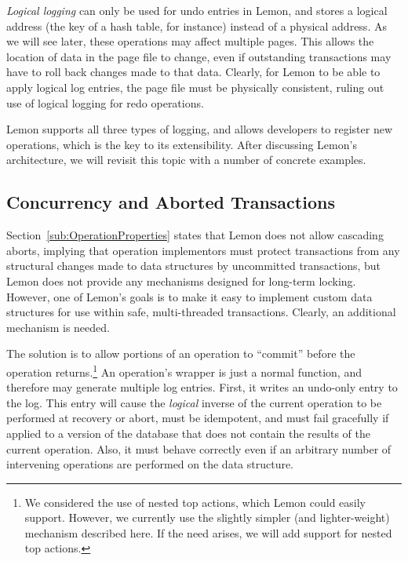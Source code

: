 \documentclass[letterpaper,twocolumn,english]{article}
\newcommand{\yad}{Lemon\xspace}
\begin{document}
{\em Logical logging } can only be used for undo entries in \yad, and
stores a logical address (the key of a hash table, for instance)
instead of a physical address. As we will see later, these operations
may affect multiple pages.  This allows the location of data in the
page file to change, even if outstanding transactions may have to roll
back changes made to that data. Clearly, for \yad to be able to apply
logical log entries, the page file must be physically consistent,
ruling out use of logical logging for redo operations.

\yad supports all three types of logging, and allows developers to
register new operations, which is the key to its extensibility. After
discussing \yad's architecture, we will revisit this topic with a number of
concrete examples.


\subsection{Concurrency and Aborted Transactions}


Section~\ref{sub:OperationProperties} states that \yad does not
allow cascading aborts, implying that operation implementors must
protect transactions from any structural changes made to data structures
by uncommitted transactions, but \yad does not provide any mechanisms
designed for long-term locking. However, one of \yad's goals is to
make it easy to implement custom data structures for use within safe,
multi-threaded transactions. Clearly, an additional mechanism is needed.

The solution is to allow portions of an operation to ``commit'' before
the operation returns.\footnote{We considered the use of nested top actions, which \yad could easily
support. However, we currently use the slightly simpler (and lighter-weight)
mechanism described here. If the need arises, we will add support
for nested top actions.}
An operation's wrapper is just a normal function, and therefore may
generate multiple log entries. First, it writes an undo-only entry
to the log. This entry will cause the \emph{logical} inverse of the
current operation to be performed at recovery or abort, must be idempotent,
and must fail gracefully if applied to a version of the database that
does not contain the results of the current operation. Also, it must
behave correctly even if an arbitrary number of intervening operations
are performed on the data structure.
\end{document}
